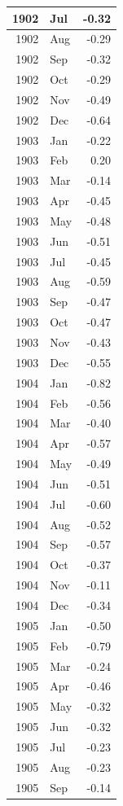 \documentclass[
]{article}
\begin{document}
\begin{table}[H]
\begin{tabular}[t]{r|l|r}
\hline
1902 & Jul & -0.32\\
\hline
1902 & Aug & -0.29\\
\hline
1902 & Sep & -0.32\\
\hline
1902 & Oct & -0.29\\
\hline
1902 & Nov & -0.49\\
\hline
1902 & Dec & -0.64\\
\hline
1903 & Jan & -0.22\\
\hline
1903 & Feb & 0.20\\
\hline
1903 & Mar & -0.14\\
\hline
1903 & Apr & -0.45\\
\hline
1903 & May & -0.48\\
\hline
1903 & Jun & -0.51\\
\hline
1903 & Jul & -0.45\\
\hline
1903 & Aug & -0.59\\
\hline
1903 & Sep & -0.47\\
\hline
1903 & Oct & -0.47\\
\hline
1903 & Nov & -0.43\\
\hline
1903 & Dec & -0.55\\
\hline
1904 & Jan & -0.82\\
\hline
1904 & Feb & -0.56\\
\hline
1904 & Mar & -0.40\\
\hline
1904 & Apr & -0.57\\
\hline
1904 & May & -0.49\\
\hline
1904 & Jun & -0.51\\
\hline
1904 & Jul & -0.60\\
\hline
1904 & Aug & -0.52\\
\hline
1904 & Sep & -0.57\\
\hline
1904 & Oct & -0.37\\
\hline
1904 & Nov & -0.11\\
\hline
1904 & Dec & -0.34\\
\hline
1905 & Jan & -0.50\\
\hline
1905 & Feb & -0.79\\
\hline
1905 & Mar & -0.24\\
\hline
1905 & Apr & -0.46\\
\hline
1905 & May & -0.32\\
\hline
1905 & Jun & -0.32\\
\hline
1905 & Jul & -0.23\\
\hline
1905 & Aug & -0.23\\
\hline
1905 & Sep & -0.14\\

\end{tabular}
\end{table}
\end{document}
